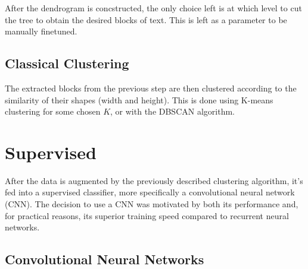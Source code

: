 After the dendrogram is concstructed, the only choice left is at which level to
cut the tree to obtain the desired blocks of text. This is left as a parameter
to be manually finetuned.

\subsection{Classical Clustering}
The extracted blocks from the previous step are then clustered according to
the similarity of their shapes (width and height). This is done using K-means
clustering for some chosen $K$, or with the DBSCAN algorithm.

\section{Supervised}
After the data is augmented by the previously described clustering algorithm,
it's fed into a supervised classifier, more specifically a convolutional neural
network (CNN). The decision to use a CNN was motivated by both its
performance\textcite{kim2014conv} and, for practical reasons, its superior
training speed compared to recurrent neural networks.

\subsection{Convolutional Neural Networks}

